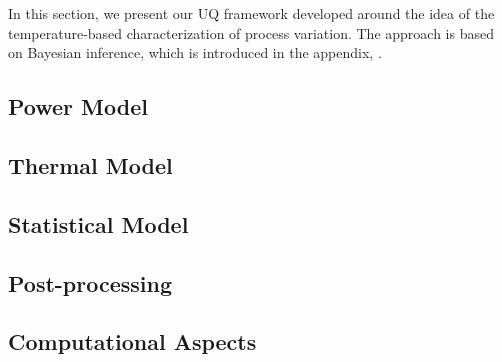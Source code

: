 In this section, we present our UQ framework developed around the idea of the temperature-based characterization of process variation. The approach is based on Bayesian inference, which is introduced in the appendix, .

\subsection{Power Model} 


\subsection{Thermal Model} 


\subsection{Statistical Model} 


\subsection{Post-processing} 


\subsection{Computational Aspects} 

